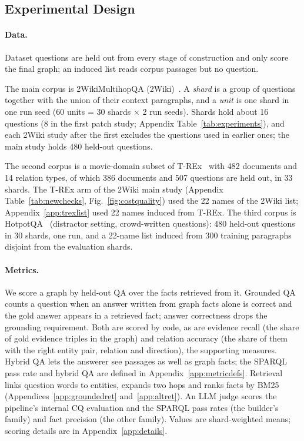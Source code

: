 \subsection{Experimental Design}
\label{sec:design}

\paragraph{Data.}
Dataset questions are held out from every stage of construction and only score the final graph; an induced list reads corpus passages but no question.

The main corpus is 2WikiMultihopQA (2Wiki)~\cite{ho2020twowiki}. A \emph{shard} is a group of questions together with the union of their context paragraphs, and a \emph{unit} is one shard in one run seed (60 units = 30 shards $\times$ 2 run seeds). Shards hold about 16 questions (8 in the first patch study; Appendix Table~\ref{tab:experiments}), and each 2Wiki study after the first excludes the questions used in earlier ones; the main study holds 480 held-out questions.

The second corpus is a movie-domain subset of T-REx~\cite{elsahar2018trex} with 482 documents and 14 relation types, of which 386 documents and 507 questions are held out, in 33 shards. The T-REx arm of the 2Wiki main study (Appendix Table~\ref{tab:newchecks}, Fig.~\ref{fig:costquality}) used the 22 names of the 2Wiki list; Appendix~\ref{app:trexlist} used 22 names induced from T-REx. The third corpus is HotpotQA~\cite{yang2018hotpotqa} (distractor setting, crowd-written questions): 480 held-out questions in 30 shards, one run, and a 22-name list induced from 300 training paragraphs disjoint from the evaluation shards.

\paragraph{Metrics.}
We score a graph by held-out QA over the facts retrieved from it. Grounded QA counts a question when an answer written from graph facts alone is correct and the gold answer appears in a retrieved fact; answer correctness drops the grounding requirement. Both are scored by code, as are evidence recall (the share of gold evidence triples in the graph) and relation accuracy (the share of them with the right entity pair, relation and direction), the supporting measures. Hybrid QA lets the answerer see passages as well as graph facts; the SPARQL pass rate and hybrid QA are defined in Appendix~\ref{app:metricdefs}. Retrieval links question words to entities, expands two hops and ranks facts by BM25 (Appendices~\ref{app:groundedret} and~\ref{app:altret}). An LLM judge scores the pipeline's internal CQ evaluation and the SPARQL pass rates (the builder's family) and fact precision (the other family). Values are shard-weighted means; scoring details are in Appendix~\ref{app:details}.

